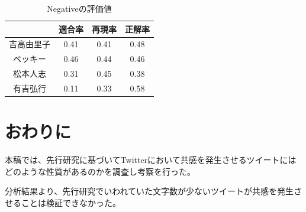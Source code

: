 \documentclass[dvipdfmx]{issj}
\begin{document}
\begin{table}[t]
  \begin{center}
    \caption{Negativeの評価値}
    \begin{tabular}{c|ccc} \hline \hline
& 適合率 & 再現率 & 正解率 \\ \hline \hline
吉高由里子 &0.41&0.41&0.48 \\ \hline
ベッキー &0.46&0.44&0.46\\ \hline
松本人志 &0.31&0.45&0.38\\ \hline
有吉弘行 & 0.11&0.33&0.58 \\ \hline
    \end{tabular}
    \label{tab:tripcode_user}
  \end{center}
\end{table}








\section{おわりに}  %

本稿では、先行研究に基づいてTwitterにおいて共感を発生させるツイートにはどのような性質があるのかを調査し考察を行った。

分析結果より、先行研究でいわれていた文字数が少ないツイートが共感を発生させることは検証できなかった。
\end{document}
